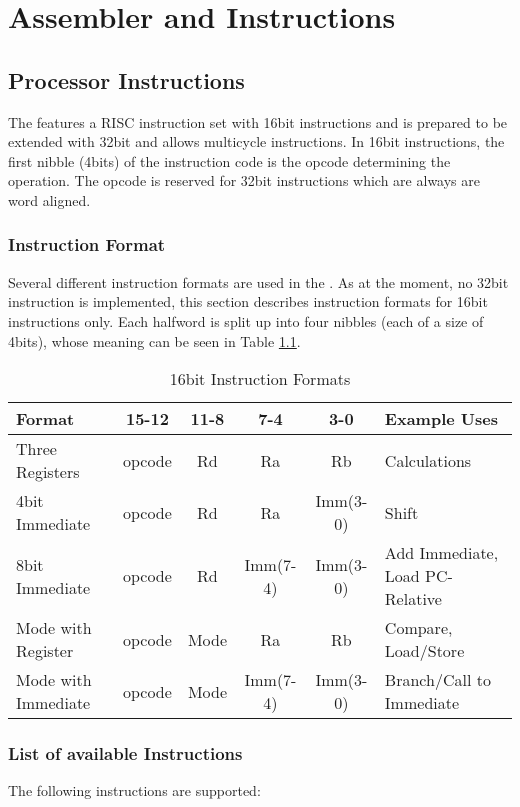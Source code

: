 \chapter{Assembler and Instructions}

\section{Processor Instructions}
The \procname features a RISC instruction set with 16bit instructions and is prepared to be extended with 32bit and allows multicycle instructions.
In 16bit instructions, the first nibble (4bits) of the instruction code is the opcode determining the operation.
The opcode  is reserved for 32bit instructions which are always are word aligned.

\subsection{Instruction Format}
Several different instruction formats are used in the \procname.
As at the moment, no 32bit instruction is implemented, this section describes instruction formats for 16bit instructions only.
Each halfword is split up into four nibbles (each of a size of 4bits), whose meaning can be seen in Table \ref{tbl:instr_formatnibbles}.

\begin{table}
\caption{16bit Instruction Formats}
\label{tbl:instr_formatnibbles}
\begin{center}
\begin{tabular}{|l||c|c|c|c||p{}|}
\hline
Format				& 15-12		& 11-8		& 7-4		& 3-0		& Example Uses\\
\hline\hline
Three Registers		& opcode		& Rd			& Ra			& Rb			& Calculations\\
\hline
4bit Immediate		& opcode		& Rd			& Ra			& Imm(3-0)	& Shift\\
\hline
8bit Immediate		& opcode		& Rd			& Imm(7-4)	& Imm(3-0)	& Add Immediate, Load PC-Relative\\
\hline
Mode	 with Register	& opcode		& Mode		& Ra			& Rb			& Compare, Load/Store\\
\hline
Mode	 with Immediate	& opcode		& Mode		& Imm(7-4)	& Imm(3-0)	& Branch/Call to Immediate\\
\hline
\end{tabular}
\end{center}
\end{table}

\subsection{List of available Instructions}
\label{sec:instructionlist}
The following instructions are supported:
